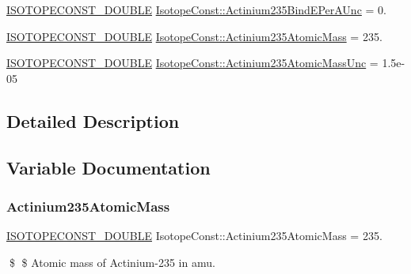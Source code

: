 \begin{DoxyCompactItemize}
\mbox{\hyperlink{group___isotope_const-_macros_ga8f45a7272ce02c0b4c65c44636ed719a}{I\+S\+O\+T\+O\+P\+E\+C\+O\+N\+S\+T\+\_\+\+D\+O\+U\+B\+LE}} \mbox{\hyperlink{group___isotope_const-_actinium-_ac235_ga3664126ff9e67df83e8b02b115937573}{Isotope\+Const\+::\+Actinium235\+Bind\+E\+Per\+A\+Unc}} = 0.
\item 
\mbox{\hyperlink{group___isotope_const-_macros_ga8f45a7272ce02c0b4c65c44636ed719a}{I\+S\+O\+T\+O\+P\+E\+C\+O\+N\+S\+T\+\_\+\+D\+O\+U\+B\+LE}} \mbox{\hyperlink{group___isotope_const-_actinium-_ac235_ga431097b59d538271379a4613869daa69}{Isotope\+Const\+::\+Actinium235\+Atomic\+Mass}} = 235.
\item 
\mbox{\hyperlink{group___isotope_const-_macros_ga8f45a7272ce02c0b4c65c44636ed719a}{I\+S\+O\+T\+O\+P\+E\+C\+O\+N\+S\+T\+\_\+\+D\+O\+U\+B\+LE}} \mbox{\hyperlink{group___isotope_const-_actinium-_ac235_ga8114bdf442cbc7ed6eb82bb5dfb21b08}{Isotope\+Const\+::\+Actinium235\+Atomic\+Mass\+Unc}} = 1.\+5e-\/05
\end{DoxyCompactItemize}


\subsection{Detailed Description}


\subsection{Variable Documentation}
\mbox{\label{group___isotope_const-_actinium-_ac235_ga431097b59d538271379a4613869daa69}} 
\subsubsection{\texorpdfstring{Actinium235\+Atomic\+Mass}{Actinium235AtomicMass}}
{\footnotesize\ttfamily \mbox{\hyperlink{group___isotope_const-_macros_ga8f45a7272ce02c0b4c65c44636ed719a}{I\+S\+O\+T\+O\+P\+E\+C\+O\+N\+S\+T\+\_\+\+D\+O\+U\+B\+LE}} Isotope\+Const\+::\+Actinium235\+Atomic\+Mass = 235.}

\$ \$ Atomic mass of Actinium-\/235 in amu. \mbox{\label{group___isotope_const-_actinium-_ac235_ga8114bdf442cbc7ed6eb82bb5dfb21b08}} 
